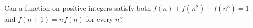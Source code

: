 Can a function on positive integers satisfy both $f(n)+f(n^2)+f(n^3)=1$ and $f(n+1)=nf(n)$ for every $n$?
